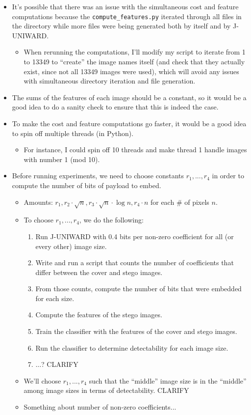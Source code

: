 \documentclass[11pt,a4paper]{report}
\begin{document}
\begin{itemize}
\item It's possible that there was an issue with the simultaneous cost and feature computations because the \texttt{compute\_features.py} iterated through all files in the directory while more files were being generated both by itself and by J-UNIWARD.
  \begin{itemize}
  \item When rerunning the computations, I'll modify my script to iterate from 1 to 13349 to ``create'' the image names itself (and check that they actually exist, since not all 13349 images were used), which will avoid any issues with simultaneous directory iteration and file generation.
  \end{itemize}

\item The sums of the features of each image should be a constant, so it would be a good idea to do a sanity check to ensure that this is indeed the case.

\item To make the cost and feature computations go faster, it would be a good idea to spin off multiple threads (in Python).
  \begin{itemize}
  \item For instance, I could spin off 10 threads and make thread 1 handle images with number 1 (mod 10).
  \end{itemize}

\item Before running experiments, we need to choose constants $r_1, ... , r_4$ in order to compute the number of bits of payload to embed.
  \begin{itemize}
  \item Amounts: $r_1, r_2 \cdot \sqrt{n}, r_3 \cdot \sqrt{n} \cdot \log n, r_4 \cdot n$ for each \# of pixels $n$.
  \item To choose $r_1, ... , r_4$, we do the following:
    \begin{enumerate}
    \item Run J-UNIWARD with 0.4 bits per non-zero coefficient for all (or every other) image size.
    \item Write and run a script that counts the number of coefficients that differ between the cover and stego images.
    \item From those counts, compute the number of bits that were embedded for each size.
    \item Compute the features of the stego images.
    \item Train the classifier with the features of the cover and stego images.
    \item Run the classifier to determine detectability for each image size.
    \item ...? CLARIFY
    \end{enumerate}
  \item We'll choose $r_1, ... , r_4$ such that the ``middle'' image size is in the ``middle'' among image sizes in terms of detectability. CLARIFY
  \item Something about number of non-zero coefficients...
  \end{itemize}


\end{itemize}
\end{document}
